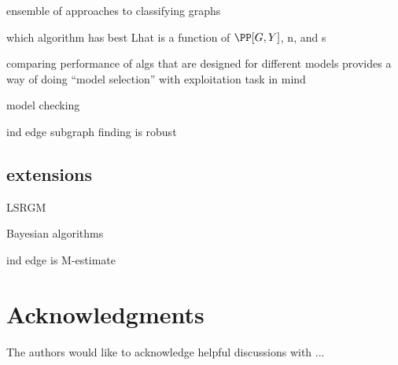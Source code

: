 
ensemble of approaches to classifying graphs

which algorithm has best Lhat is a function of $\PP[G,Y]$, n, and s

comparing performance of algs that are designed for different models provides a way of doing ``model selection'' with exploitation task in mind

model checking

ind edge subgraph finding is robust 

\subsection{extensions} %
\label{sub:extensions}

LSRGM

Bayesian algorithms

ind edge is M-estimate




\clearpage
\appendix

\section*{Acknowledgments}

The authors would like to acknowledge helpful discussions with ...

% 




